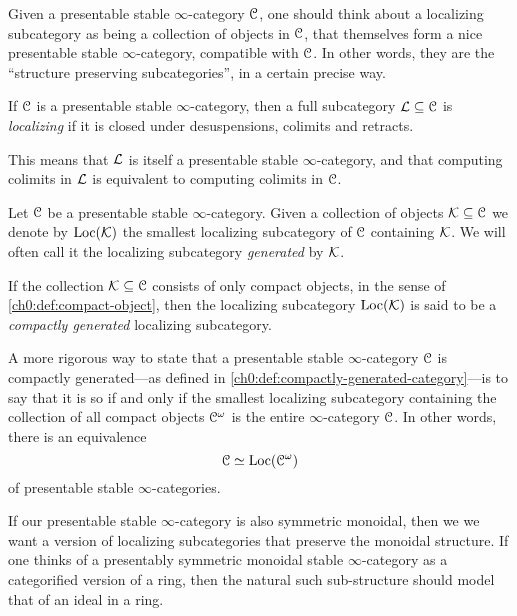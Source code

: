 Given a presentable stable $\infty$-category $\EuScript{C}$, one should think about a localizing subcategory as being a collection of objects in $\EuScript{C}$, that themselves form a nice presentable stable $\infty$-category, compatible with $\EuScript{C}$. In other words, they are the ``structure preserving subcategories'', in a certain precise way. 

\begin{definition}
    \label{ch0:def:localizing-subcategory}
    If $\EuScript{C}$ is a presentable stable $\infty$-category, then a full subcategory $\mathcal{L}\subseteq \EuScript{C}$ is \emph{localizing} if it is closed under desuspensions, colimits and retracts. 
\end{definition}

This means that $\mathcal{L}$ is itself a presentable stable $\infty$-category, and that computing colimits in $\mathcal{L}$ is equivalent to computing colimits in $\EuScript{C}$. 

\begin{definition}
    Let $\EuScript{C}$ be a presentable stable $\infty$-category. Given a collection of objects $\mathcal{K}\subseteq \EuScript{C}$ we denote by $\operatorname{Loc}(\mathcal{K})$ the smallest localizing subcategory of $\EuScript{C}$ containing $\mathcal{K}$. We will often call it the localizing subcategory \emph{generated} by $\mathcal{K}$. 
\end{definition}

\begin{remark}
    \label{ch0:rm:compactly-generated-localizing-subcategory}
    If the collection $\mathcal{K} \subseteq \EuScript{C}$ consists of only compact objects, in the sense of \cref{ch0:def:compact-object}, then the localizing subcategory $\operatorname{Loc}(\mathcal{K})$ is said to be a \emph{compactly generated} localizing subcategory. 
\end{remark}

\begin{remark}
    A more rigorous way to state that a presentable stable $\infty$-category $\EuScript{C}$ is compactly generated---as defined in \cref{ch0:def:compactly-generated-category}---is to say that it is so if and only if the smallest localizing subcategory containing the collection of all compact objects $\EuScript{C}^\omega$ is the entire $\infty$-category $\EuScript{C}$. In other words, there is an equivalence  
    \[\EuScript{C}\simeq \operatorname{Loc}(\EuScript{C}^\omega)\]
    of presentable stable $\infty$-categories. 
\end{remark}

If our presentable stable $\infty$-category is also symmetric monoidal, then we we want a version of localizing subcategories that preserve the monoidal structure. If one thinks of a presentably symmetric monoidal stable $\infty$-category as a categorified version of a ring, then the natural such sub-structure should model that of an ideal in a ring. 

